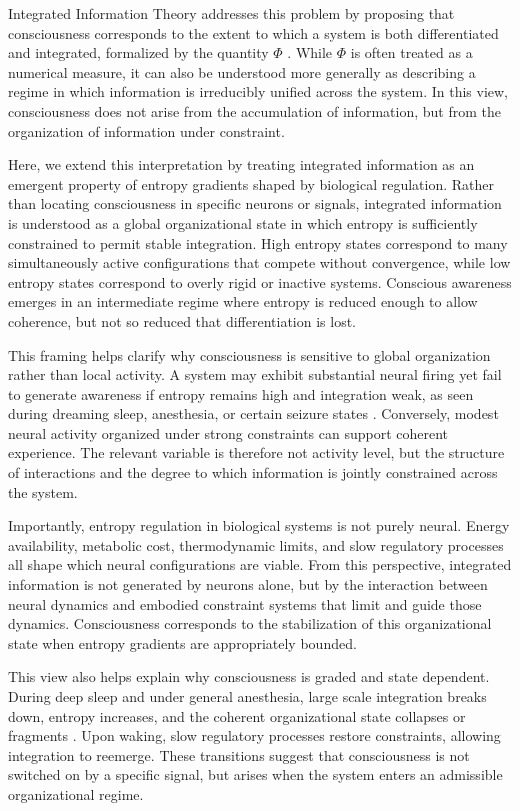 \documentclass[12pt,letterpaper]{article}
\begin{document}
Integrated Information Theory addresses this problem by proposing that consciousness corresponds to the extent to which a system is both differentiated and integrated, formalized by the quantity $\Phi$ \cite{tononi2004, tononi2016}. While $\Phi$ is often treated as a numerical measure, it can also be understood more generally as describing a regime in which information is irreducibly unified across the system. In this view, consciousness does not arise from the accumulation of information, but from the organization of information under constraint.

Here, we extend this interpretation by treating integrated information as an emergent property of entropy gradients shaped by biological regulation. Rather than locating consciousness in specific neurons or signals, integrated information is understood as a global organizational state in which entropy is sufficiently constrained to permit stable integration. High entropy states correspond to many simultaneously active configurations that compete without convergence, while low entropy states correspond to overly rigid or inactive systems. Conscious awareness emerges in an intermediate regime where entropy is reduced enough to allow coherence, but not so reduced that differentiation is lost.

This framing helps clarify why consciousness is sensitive to global organization rather than local activity. A system may exhibit substantial neural firing yet fail to generate awareness if entropy remains high and integration weak, as seen during dreaming sleep, anesthesia, or certain seizure states \cite{koch2019}. Conversely, modest neural activity organized under strong constraints can support coherent experience. The relevant variable is therefore not activity level, but the structure of interactions and the degree to which information is jointly constrained across the system.

Importantly, entropy regulation in biological systems is not purely neural. Energy availability, metabolic cost, thermodynamic limits, and slow regulatory processes all shape which neural configurations are viable. From this perspective, integrated information is not generated by neurons alone, but by the interaction between neural dynamics and embodied constraint systems that limit and guide those dynamics. Consciousness corresponds to the stabilization of this organizational state when entropy gradients are appropriately bounded.

This view also helps explain why consciousness is graded and state dependent. During deep sleep and under general anesthesia, large scale integration breaks down, entropy increases, and the coherent organizational state collapses or fragments \cite{massimini2005, casali2013}. Upon waking, slow regulatory processes restore constraints, allowing integration to reemerge. These transitions suggest that consciousness is not switched on by a specific signal, but arises when the system enters an admissible organizational regime.
\end{document}
